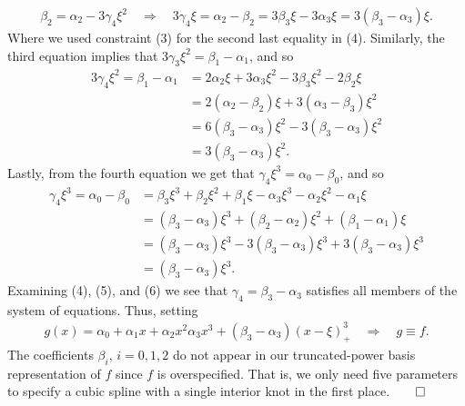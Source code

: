 \documentclass[10pt]{article}
\newcommand{\1}[1]{\mathbbm{1}_{#1}}
\begin{document}
    \begin{align*}
        \beta_2=\alpha_2-3\gamma_4\xi^2\quad\Rightarrow\quad 3\gamma_4\xi=\alpha_2-\beta_2=3\beta_3\xi-3\alpha_3\xi=3(\beta_3-\alpha_3)\xi.\tag{4}
    \end{align*}
    Where we used constraint (3) for the second last equality in (4). Similarly, the third equation implies that $3\gamma_3\xi^2=\beta_1-\alpha_1$, and so
    \begin{align*}
        3\gamma_4\xi^2=\beta_1-\alpha_1&=2\alpha_2\xi+3\alpha_3\xi^2-3\beta_3\xi^2-2\beta_2\xi\tag{by (2)}\\
        &=2(\alpha_2-\beta_2)\xi+3(\alpha_3-\beta_3)\xi^2\\
        &=6(\beta_3-\alpha_3)\xi^2-3(\beta_3-\alpha_3)\xi^2\tag{by (4)}\\
        &=3(\beta_3-\alpha_3)\xi^2.\tag{5}
    \end{align*}
    Lastly, from the fourth equation we get that $\gamma_4\xi^3=\alpha_0-\beta_0$, and so
    \begin{align*}
        \gamma_4\xi^3=\alpha_0-\beta_0&=\beta_3\xi^3+\beta_2\xi^2+\beta_1\xi-\alpha_3\xi^3-\alpha_2\xi^2-\alpha_1\xi\\
        &=(\beta_3-\alpha_3)\xi^3+(\beta_2-\alpha_2)\xi^2+(\beta_1-\alpha_1)\xi\\
        &=(\beta_3-\alpha_3)\xi^3-3(\beta_3-\alpha_3)\xi^3+3(\beta_3-\alpha_3)\xi^3\tag{by (4) and (5)}\\
        &=(\beta_3-\alpha_3)\xi^3.\tag{6}
    \end{align*}
    Examining (4), (5), and (6) we see that $\gamma_4=\beta_3-\alpha_3$ satisfies all members of the system of equations. Thus, setting
    \begin{align*}
        g(x)=\alpha_0+\alpha_1x+\alpha_2x^2\alpha_3x^3+(\beta_3-\alpha_3)(x-\xi)^3_+\quad\Rightarrow\quad g\equiv f.
    \end{align*}
    The coefficients $\beta_i$, $i=0,1,2$ do not appear in our truncated-power basis representation of $f$ since $f$ is overspecified. That is, we only need five parameters to
    specify a cubic spline with a single interior knot in the first place.\hfill{$\qed$}\\[5pt]
\end{document}
